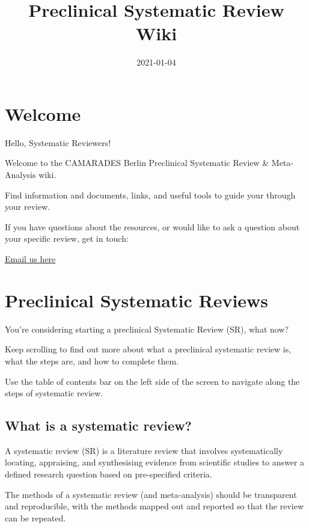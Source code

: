 \documentclass[
]{book}
\title{Preclinical Systematic Review Wiki}
\author{}
\date{\vspace{-2.5em}2021-01-04}
\begin{document}
\maketitle

{
\setcounter{tocdepth}{1}
\tableofcontents
}
\hypertarget{welcome}{%
\chapter{Welcome}\label{welcome}}

Hello, Systematic Reviewers!

Welcome to the CAMARADES Berlin Preclinical Systematic Review \& Meta-Analysis wiki.

Find information and documents, links, and useful tools to guide your through your review.

If you have questions about the resources, or would like to ask a question about your specific review, get in touch:

\href{mailto:CAMARADES.berlin@charite.de}{Email us here}

\hypertarget{intro}{%
\chapter{Preclinical Systematic Reviews}\label{intro}}

You're considering starting a preclinical Systematic Review (SR), what now?

Keep scrolling to find out more about what a preclinical systematic review is, what the steps are, and how to complete them.

Use the table of contents bar on the left side of the screen to navigate along the steps of systematic review.

\hypertarget{what-is-a-systematic-review}{%
\section{What is a systematic review?}\label{what-is-a-systematic-review}}

A systematic review (SR) is a literature review that involves systematically locating, appraising, and synthesising evidence from scientific studies to answer a defined research question based on pre-specified criteria.

The methods of a systematic review (and meta-analysis) should be transparent and reproducible, with the methods mapped out and reported so that the review can be repeated.
\end{document}
